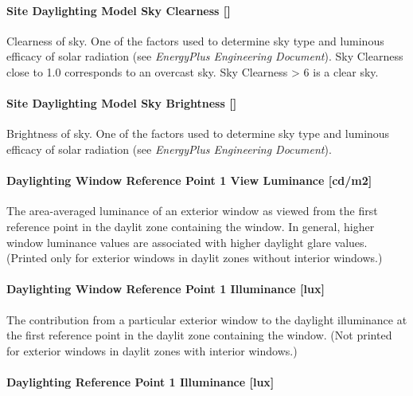 \paragraph{Site Daylighting Model Sky Clearness {[]}}\label{site-daylighting-model-sky-clearness}

Clearness of sky. One of the factors used to determine sky type and luminous efficacy of solar radiation (see \emph{EnergyPlus Engineering Document}). Sky Clearness close to 1.0 corresponds to an overcast sky. Sky Clearness \textgreater{} 6 is a clear sky.

\paragraph{Site Daylighting Model Sky Brightness {[]}}\label{site-daylighting-model-sky-brightness}

Brightness of sky. One of the factors used to determine sky type and luminous efficacy of solar radiation (see \emph{EnergyPlus Engineering Document}).

\paragraph{Daylighting Window Reference Point 1 View Luminance {[}cd/m2{]}}\label{daylighting-window-reference-point-1-view-luminance-cdm2}

The area-averaged luminance of an exterior window as viewed from the first reference point in the daylit zone containing the window. In general, higher window luminance values are associated with higher daylight glare values. (Printed only for exterior windows in daylit zones without interior windows.)

\paragraph{Daylighting Window Reference Point 1 Illuminance {[}lux{]}}\label{daylighting-window-reference-point-1-illuminance-lux}

The contribution from a particular exterior window to the daylight illuminance at the first reference point in the daylit zone containing the window. (Not printed for exterior windows in daylit zones with interior windows.)

\paragraph{Daylighting Reference Point 1 Illuminance {[}lux{]}}\label{daylighting-reference-point-1-illuminance-lux}

